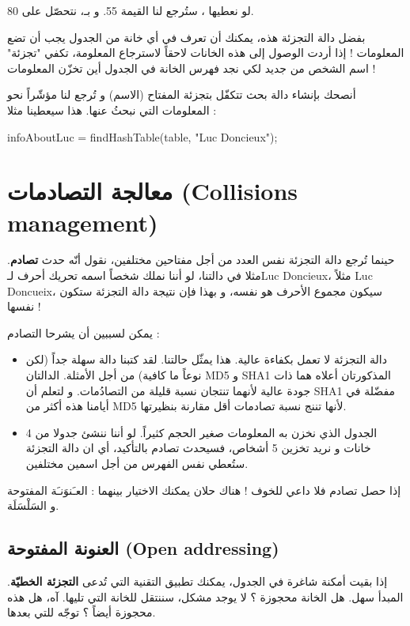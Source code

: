 لو نعطيها
،
ستُرجع لنا القيمة 55. و بـ،
نتحصّل على 80.

بفضل دالة التجزئة هذه، يمكنك أن تعرف في أي خانة من الجدول يجب أن تضع المعلومات ! إذا أردت الوصول إلى هذه الخانات لاحقاً لاسترجاع المعلومة، تكفي "تجزئة" اسم الشخص من جديد لكي نجد فهرس الخانة في الجدول أين تخزّن المعلومات !

أنصحك بإنشاء دالة بحث تتكفّل بتجزئة المفتاح (الاسم) و تُرجع لنا مؤشّراً نحو المعلومات التي نبحثُ عنها. هذا سيعطينا مثلا :

\begin{Csource}
infoAboutLuc = findHashTable(table, "Luc Doncieux");
\end{Csource}

\section{معالجة التصادمات (\textenglish{Collisions management})}

حينما تُرجع دالة التجزئة نفس العدد من أجل مفتاحين مختلفين، نقول أنّه حدث 
\textbf{تصادم}.
مثلا في دالتنا، لو أننا نملك شخصاً اسمه تحريك أحرف لـ\textenglish{Luc Doncieux}،
مثلاً
\textenglish{Luc Doncueix}،
سيكون مجموع الأحرف هو نفسه، و بهذا فإن نتيجة دالة التجزئة ستكون نفسها !

يمكن لسببين أن يشرحا التصادم :

\begin{itemize}
	\item دالة التجزئة لا تعمل بكفاءة عالية. هذا يمثّل حالتنا. لقد كتبنا دالة سهلة جداً (لكن نوعاً ما كافية) من أجل الأمثلة. الدالتان 
	\textenglish{MD5}
	و
	\textenglish{SHA1}
	المذكورتان أعلاه هما ذات جودة عالية لأنهما تنتجان نسبة قليلة من التصادُمات. و لتعلم أن 
	\textenglish{SHA1}
	مفضّلة في أيامنا هذه أكثر من
	\textenglish{MD5}
	لأنها تننج نسبة تصادمات أقل مقارنة بنظيرتها.
	
	\item الجدول الذي نخزن به المعلومات صغير الحجم كثيراً. لو أننا ننشئ جدولا من 4 خانات و نريد تخزين 5 أشخاص، فسيحدث تصادم بالتأكيد، أي ان دالة التجزئة ستُعطي نفس الفهرس من أجل اسمين مختلفين.
\end{itemize}

إذا حصل تصادم فلا داعي للخوف ! هناك حلان يمكنك الاختيار بينهما : العـَنوَنـَة المفتوحة و السَلْسَلَة.


\subsection{العنونة المفتوحة (\textenglish{Open addressing})}
إذا بقيت أمكنة شاغرة في الجدول، يمكنك تطبيق التقنية التي تُدعى 
\textbf{التجزئة الخطيّة}.
المبدأ سهل. هل الخانة محجوزة ؟ لا يوجد مشكل، سننتقل للخانة التي تليها. آه، هل هذه محجوزة أيضاً ؟ توجّه للتي بعدها.

